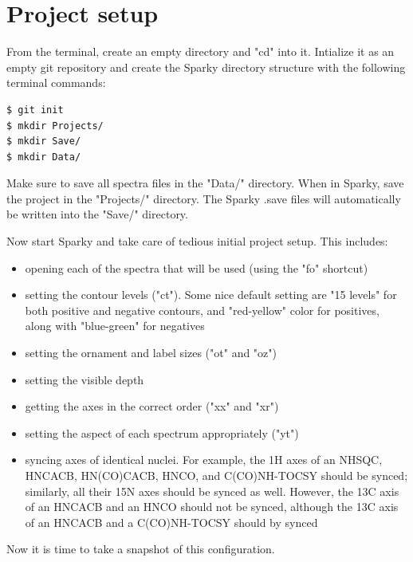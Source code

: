 \section{Project setup}
From the terminal, create an empty directory and "cd" into it.
Intialize it as an empty git repository and create the Sparky directory
structure with the following terminal commands:
\begin{verbatim}
$ git init
$ mkdir Projects/
$ mkdir Save/
$ mkdir Data/
\end{verbatim} 
Make sure to save all spectra files in the "Data/" directory.
When in Sparky, save the project in the "Projects/" directory.
The Sparky .save files will automatically be written into the "Save/"
directory.

Now start Sparky and take care of tedious initial project setup.  This includes:
\begin{itemize}
  \item opening each of the spectra that will be used (using the "fo" shortcut)
  \item setting the contour levels ("ct").  Some nice default setting are
    "15 levels" for both positive and negative contours, and "red-yellow" color
    for positives, along with "blue-green" for negatives
  \item setting the ornament and label sizes ("ot" and "oz")
  \item setting the visible depth
  \item getting the axes in the correct order ("xx" and "xr")
  \item setting the aspect of each spectrum appropriately ("yt")
  \item syncing axes of identical nuclei.  For example, the 1H axes of
    an NHSQC, HNCACB, HN(CO)CACB, HNCO, and C(CO)NH-TOCSY should be synced; 
    similarly, all their 15N axes should be synced as well.  However, the
    13C axis of an HNCACB and an HNCO should not be synced, although the
    13C axis of an HNCACB and a C(CO)NH-TOCSY should by synced
\end{itemize}
Now it is time to take a snapshot of this configuration.


